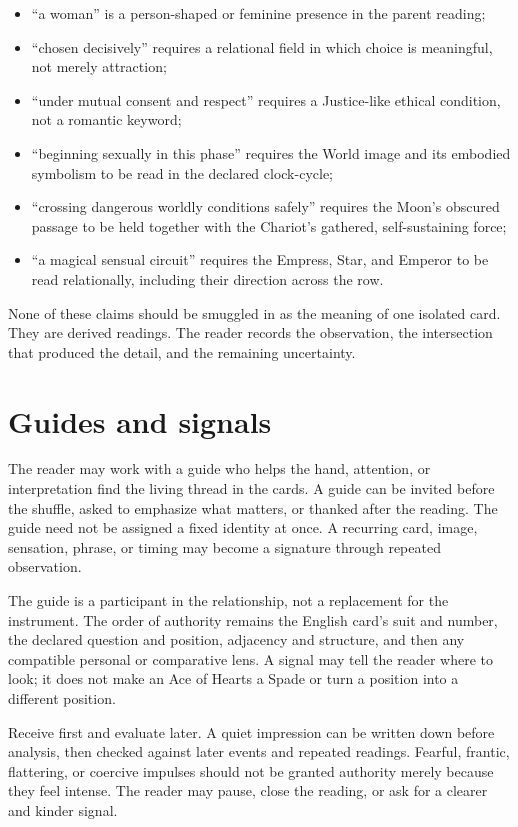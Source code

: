 \begin{itemize}
\item ``a woman'' is a person-shaped or feminine presence in the parent reading;
\item ``chosen decisively'' requires a relational field in which choice is
      meaningful, not merely attraction;
\item ``under mutual consent and respect'' requires a Justice-like ethical
      condition, not a romantic keyword;
\item ``beginning sexually in this phase'' requires the World image and its
      embodied symbolism to be read in the declared clock-cycle;
\item ``crossing dangerous worldly conditions safely'' requires the Moon's
      obscured passage to be held together with the Chariot's gathered,
      self-sustaining force;
\item ``a magical sensual circuit'' requires the Empress, Star, and Emperor to
      be read relationally, including their direction across the row.
\end{itemize}

None of these claims should be smuggled in as the meaning of one isolated card.
They are derived readings. The reader records the observation, the intersection
that produced the detail, and the remaining uncertainty.

\section{Guides and signals}

The reader may work with a guide who helps the hand, attention, or
interpretation find the living thread in the cards. A guide can be invited
before the shuffle, asked to emphasize what matters, or thanked after the
reading. The guide need not be assigned a fixed identity at once. A recurring
card, image, sensation, phrase, or timing may become a signature through
repeated observation.

The guide is a participant in the relationship, not a replacement for the
instrument. The order of authority remains the English card's suit and number,
the declared question and position, adjacency and structure, and then any
compatible personal or comparative lens. A signal may tell the reader where to
look; it does not make an Ace of Hearts a Spade or turn a position into a
different position.

Receive first and evaluate later. A quiet impression can be written down before
analysis, then checked against later events and repeated readings. Fearful,
frantic, flattering, or coercive impulses should not be granted authority merely
because they feel intense. The reader may pause, close the reading, or ask for
a clearer and kinder signal.

